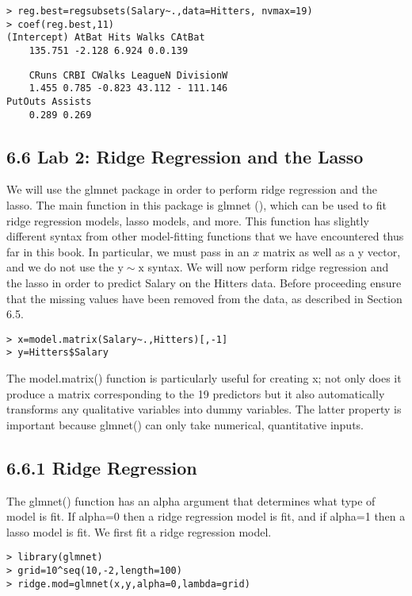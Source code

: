 \documentclass[10pt]{article}
\begin{document}
\begin{verbatim}
> reg.best=regsubsets(Salary~.,data=Hitters, nvmax=19)
> coef(reg.best,11)
(Intercept) AtBat Hits Walks CAtBat
    135.751 -2.128 6.924 0.0.139
\end{verbatim}

\begin{verbatim}
    CRuns CRBI CWalks LeagueN DivisionW
    1.455 0.785 -0.823 43.112 - 111.146
PutOuts Assists
    0.289 0.269
\end{verbatim}

\subsection*{6.6 Lab 2: Ridge Regression and the Lasso}
We will use the glmnet package in order to perform ridge regression and the lasso. The main function in this package is glmnet (), which can be used to fit ridge regression models, lasso models, and more. This function has slightly different syntax from other model-fitting functions that we have encountered thus far in this book. In particular, we must pass in an $x$ matrix as well as a y vector, and we do not use the $\mathrm{y} \sim \mathrm{x}$ syntax. We will now perform ridge regression and the lasso in order to predict Salary on the Hitters data. Before proceeding ensure that the missing values have been removed from the data, as described in Section 6.5.

\begin{verbatim}
> x=model.matrix(Salary~.,Hitters)[,-1]
> y=Hitters$Salary
\end{verbatim}

The model.matrix() function is particularly useful for creating x; not only does it produce a matrix corresponding to the 19 predictors but it also automatically transforms any qualitative variables into dummy variables. The latter property is important because glmnet() can only take numerical, quantitative inputs.

\subsection*{6.6.1 Ridge Regression}
The glmnet() function has an alpha argument that determines what type of model is fit. If alpha=0 then a ridge regression model is fit, and if alpha=1 then a lasso model is fit. We first fit a ridge regression model.

\begin{verbatim}
> library(glmnet)
> grid=10^seq(10,-2,length=100)
> ridge.mod=glmnet(x,y,alpha=0,lambda=grid)
\end{verbatim}
\end{document}
